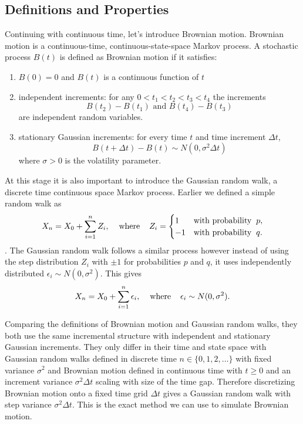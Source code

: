 \documentclass[11pt,a4paper]{article}
\begin{document}
\subsection{Definitions and Properties}
Continuing with continuous time, let's introduce Brownian motion. Brownian motion is a continuous-time, continuous-state-space Markov process. A stochastic process $B(t)$ is defined as Brownian motion if it satisfies:
\begin{enumerate}
    \item $B(0) = 0$ and $B(t)$ is a continuous function of $t$
    \item independent increments: for any $0 < t_1 < t_2 < t_3 <  t_4$ the increments \[B(t_2) - B(t_1)\text{ and } B(t_4) - B(t_3)\] are independent random variables.
    \item stationary Gaussian increments: for every time $t$ and time increment $\Delta t$, \[B(t+\Delta t) - B(t) \sim N(0, \sigma ^2 \Delta t)\] where $\sigma  > 0$ is the volatility parameter.
\end{enumerate}

At this stage it is also important to introduce the Gaussian random walk, a discrete time continuous space Markov process. Earlier we defined a simple random walk as \[ X_n = X_0 + \sum^n_{i=1}Z_i, \hspace{4mm} \text{where} \hspace{4mm} Z_i = \begin{cases}
    1  &\text{with probability} \hspace{2mm}p,\\
    -1  &\text{with probability}\hspace{2mm} q.
\end{cases}\].
The Gaussian random walk follows a similar process however instead of using the step distribution $Z_i$ with $\pm 1$ for probabilities $p$ and $q$, it uses independently distributed $\epsilon_i \sim N(0, \sigma ^2)$. This gives \[ X_n = X_0 + \sum^n_{i=1}\epsilon_i, \hspace{4mm} \text{where} \hspace{4mm} \epsilon_i\sim N(0, \sigma ^2). \]

Comparing the definitions of Brownian motion and Gaussian random walks, they both use the same incremental structure with independent and stationary Gaussian increments. They only differ in their time and state space with Gaussian random walks defined in discrete time $n \in \{0,1,2,\dots \}$ with fixed variance $\sigma ^2$ and Brownian motion defined in continuous time with $t \geq 0$ and an increment variance $\sigma^2 \Delta t$ scaling with size of the time gap. Therefore discretizing Brownian motion onto a fixed time grid $\Delta t$ gives a Gaussian random walk with step variance $\sigma ^2 \Delta t$. This is the exact method we can use to simulate Brownian motion.
\end{document}
